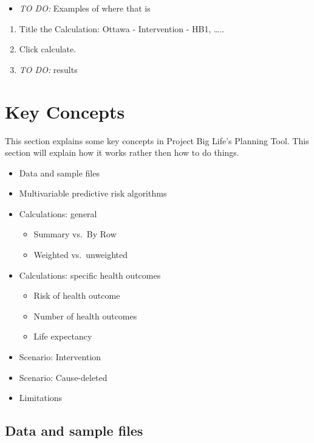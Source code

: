 \documentclass[]{book}
\providecommand{\tightlist}{%
  \setlength{\itemsep}{0pt}\setlength{\parskip}{0pt}}
\begin{document}
\begin{itemize}
\tightlist
\item
  \emph{TO DO: } Examples of where that is
\end{itemize}

\begin{enumerate}
\def\labelenumi{\arabic{enumi}.}
\setcounter{enumi}{5}
\item
  Title the Calculation: Ottawa - Intervention - HB1, \ldots{}..
\item
  Click calculate.
\item
  \emph{TO DO:} results
\end{enumerate}

\chapter{Key Concepts}\label{keyconcepts}

This section explains some key concepts in Project Big Life's Planning
Tool. This section will explain how it works rather then how to do
things.

\begin{itemize}
\item
  Data and sample files
\item
  Multivariable predictive risk algorithms
\item
  Calculations: general

  \begin{itemize}
  \tightlist
  \item
    Summary vs.~By Row
  \item
    Weighted vs.~unweighted
  \end{itemize}
\item
  Calculations: specific health outcomes

  \begin{itemize}
  \tightlist
  \item
    Risk of health outcome
  \item
    Number of health outcomes
  \item
    Life expectancy
  \end{itemize}
\item
  Scenario: Intervention
\item
  Scenario: Cause-deleted
\item
  Limitations
\end{itemize}

\section{Data and sample files}\label{data-and-sample-files}
\end{document}
